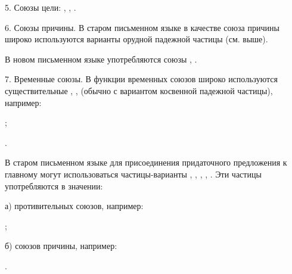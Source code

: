 5. Союзы цели: , , .

6. Союзы причины. В старом письменном языке в качестве союза причины широко используются варианты орудной падежной частицы (см. выше).

В новом письменном языке употребляются союзы , .

7. Временные союзы. В функции временных союзов широко используются существительные , ,  (обычно с вариантом косвенной падежной частицы), например:
\begin{prfsample}
	\item {};
	\item {}.
\end{prfsample}

В старом письменном языке для присоединения придаточного предложения к главному могут использоваться частицы-варианты , , , , . Эти частицы употребляются в значении:

а) противительных союзов, например:
\begin{prfsample}
	\item {};
\end{prfsample}

б) союзов причины, например:
\begin{prfsample}
	\item {}.
\end{prfsample}

